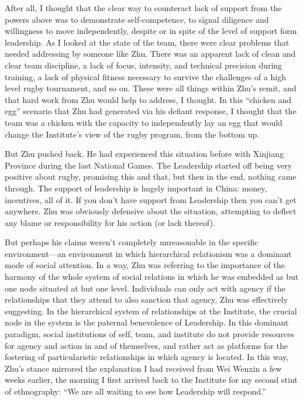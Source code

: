 \begin{CJK}{UTF8}{gbsn}
After all, I thought that the clear way to counteract lack of support from the powers above was to demonstrate self-competence, to signal diligence and willingness to move independently, despite or in spite of the level of support form leadership.  As I looked at the state of the team, there were clear problems that needed addressing by someone like Zhu.  There was an apparent lack of clean and clear team discipline, a lack of focus, intensity, and technical precision during training, a lack of physical fitness necessary to survive the challenges of a high level rugby tournament, and so on.  These were all things within Zhu's remit, and that hard work from Zhu would help to address, I thought.  In this ``chicken and egg'' scenario that Zhu had generated via his defiant response, I thought that the team was a chicken with the capacity to independently lay an egg that would change the Institute's view of the rugby program, from the bottom up.

But Zhu pushed back.  He had experienced this situation before with Xinjiang Province during the last National Games.  The Leadership started off being very positive about rugby, promising this and that, but then in the end, nothing came through.  The support of leadership is hugely important in China: money, incentives, all of it.  If you don't have support from Leadership then you can't get anywhere.  Zhu was obviously defensive about the situation, attempting to deflect any blame or responsibility for his action (or lack thereof).

But perhaps his claims weren't completely unreasonable in the specific environment---an environment in which hierarchical relationism was a dominant mode of social attention.  In a way, Zhu was referring to the importance of the harmony of the whole system of social relations in which he was embedded as but one node situated at but one level. Individuals can only act with agency if the relationships that they attend to also sanction that agency, Zhu was effectively suggesting.  In the hierarchical system of relationships at the Institute, the crucial node in the system is the paternal benevolence of Leadership.  In this dominant paradigm, social institutions of self, team, and institute do not provide resources for agency and action in and of themselves, and rather act as platforms for the fostering of particularistic relationships in which agency is located.  In this way, Zhu's stance mirrored the explanation I had received from Wei Wenxin a few weeks earlier, the morning I first arrived back to the Institute for my second stint of ethnography: ``We are all waiting to see how Leadership will respond.''



\end{CJK}
